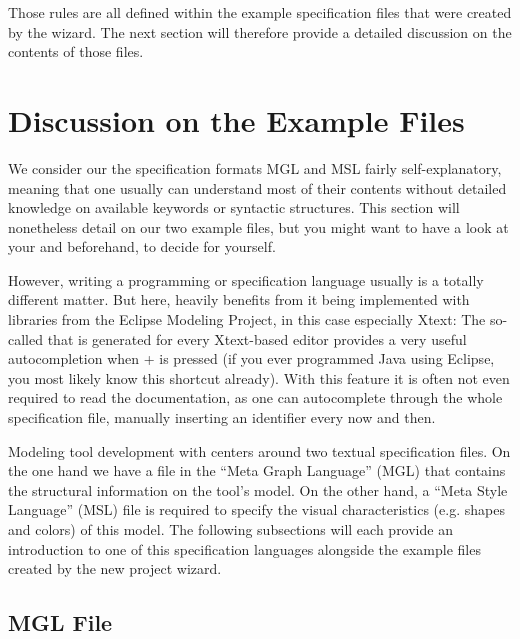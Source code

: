 \documentclass[a4paper,american,12pt]{scrreprt}
\begin{document}
Those rules are all defined within the example \cinco specification files that
were created by the wizard. The next section will therefore provide a detailed
discussion on the contents of those files.

\section{Discussion on the Example Files}
\label{sec:examplefiles}

We consider our the specification formats MGL and MSL fairly self-explanatory,
meaning that one usually can understand most of their contents without detailed
knowledge on available keywords or syntactic structures. This section
will nonetheless detail on our two example files, but you might want to have a look at
your  and  beforehand, to decide for
yourself. 

However, writing a programming or specification language usually is a totally
different matter. But here, \cinco heavily benefits from it being implemented
with libraries from the Eclipse Modeling Project, in this case especially Xtext:
The so-called  that is generated for every Xtext-based
editor provides a very useful autocompletion when
+ is pressed (if you ever programmed Java using
Eclipse, you most likely know this shortcut already). With this feature it is
often not even required to read the documentation, as one can autocomplete
through the whole specification file, manually inserting an identifier every now and
then.

Modeling tool development with \cinco centers around two textual specification
files. On the one hand we have a file in the ``Meta Graph Language'' (MGL) that
contains the structural information on the tool's model. On the other hand, a
``Meta Style Language'' (MSL) file\footnotemark{} is required to specify the
visual characteristics (e.g.  shapes and colors) of this model. The following
subsections will each provide an introduction to one of this specification
languages alongside the example files created by the new project wizard.



\subsection{MGL File}
\end{document}
